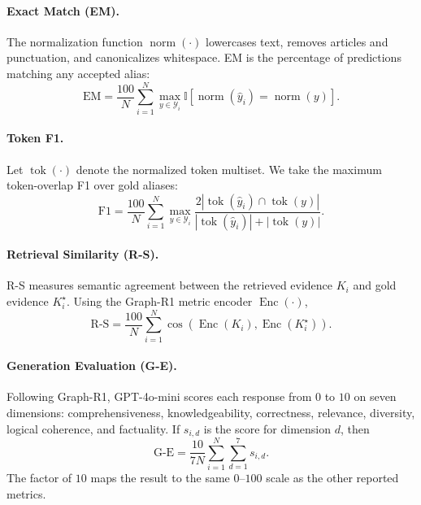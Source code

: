 \documentclass[letterpaper]{article} %
\begin{document}
\paragraph{Exact Match (EM).}
The normalization function $\operatorname{norm}(\cdot)$ lowercases text, removes articles and punctuation, and canonicalizes whitespace.
EM is the percentage of predictions matching any accepted alias:
\begin{equation}
\mathrm{EM}
=\frac{100}{N}\sum_{i=1}^{N}
\max_{y\in\mathcal{Y}_i}
\mathbb{I}\!\left[\operatorname{norm}(\hat y_i)=\operatorname{norm}(y)\right].
\end{equation}

\paragraph{Token F1.}
Let $\operatorname{tok}(\cdot)$ denote the normalized token multiset.
We take the maximum token-overlap F1 over gold aliases:
\begin{equation}
\mathrm{F1}
=\frac{100}{N}\sum_{i=1}^{N}
\max_{y\in\mathcal{Y}_i}
\frac{2\left|\operatorname{tok}(\hat y_i)\cap\operatorname{tok}(y)\right|}
{\left|\operatorname{tok}(\hat y_i)\right|+\left|\operatorname{tok}(y)\right|}.
\end{equation}

\paragraph{Retrieval Similarity (R-S).}
R-S measures semantic agreement between the retrieved evidence $K_i$ and gold evidence $K_i^\star$.
Using the Graph-R1 metric encoder $\operatorname{Enc}(\cdot)$,
\begin{equation}
\mathrm{R\mbox{-}S}
=\frac{100}{N}\sum_{i=1}^{N}
\cos\!\left(\operatorname{Enc}(K_i),\operatorname{Enc}(K_i^\star)\right).
\end{equation}

\paragraph{Generation Evaluation (G-E).}
Following Graph-R1, GPT-4o-mini scores each response from $0$ to $10$ on seven dimensions: comprehensiveness, knowledgeability, correctness, relevance, diversity, logical coherence, and factuality.
If $s_{i,d}$ is the score for dimension $d$, then
\begin{equation}
\mathrm{G\mbox{-}E}
=\frac{10}{7N}\sum_{i=1}^{N}\sum_{d=1}^{7}s_{i,d}.
\end{equation}
The factor of $10$ maps the result to the same $0$--$100$ scale as the other reported metrics.
\end{document}
